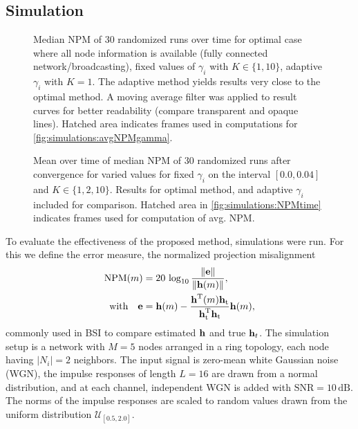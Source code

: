 \documentclass{article}
\begin{document}
\subsection[]{Simulation}
\begin{figure}[t]
    \centering
    
    \caption[]{Median NPM of 30 randomized runs over time for optimal case where all node information is available (fully connected network/broadcasting), fixed values of \(\gamma_i\) with \(K \in \{1,10\}\), adaptive \(\gamma_i\) with \(K=1\). The adaptive method yields results very close to the optimal method. A moving average filter was applied to result curves for better readability (compare transparent and opaque lines). Hatched area indicates frames used in computations for \autoref{fig:simulations:avgNPMgamma}.}
    \label{fig:simulations:NPMtime}
\end{figure}
\begin{figure}[t]
    \centering
    
    \caption[]{Mean over time of median NPM of 30 randomized runs after convergence for varied values for fixed \(\gamma_i\) on the interval \([0.0, 0.04]\) and \(K \in \{1,2,10\}\). Results for optimal method, and adaptive \(\gamma_i\) included for comparison. Hatched area in \autoref{fig:simulations:NPMtime} indicates frames used for computation of avg. NPM.}
    \label{fig:simulations:avgNPMgamma}
\end{figure}
To evaluate the effectiveness of the proposed method, simulations were run.
For this we define the error measure, the normalized projection misalignment
\begin{equation}
    \begin{aligned}
        \text{NPM}(m) &= 20\,\log_{10} \frac{\left\| \bm{\mathrm{e}} \right\|}{\left\|\bm{\mathrm{h}}(m)\right\|},\\
        \text{with}\quad \bm{\mathrm{e}} &= \bm{\mathrm{h}}(m) - \frac{\bm{\mathrm{h}}^{\mathrm{T}} (m) \bm{\mathrm{h}}_{\text{t}}}{\bm{\mathrm{h}}_{\text{t}}^{\mathrm{T}} \bm{\mathrm{h}}_{\text{t}}}\bm{\mathrm{h}}(m),
    \end{aligned}
\end{equation}
commonly used in BSI to compare estimated \(\bm{\mathrm{h}}\) and true \(\bm{\mathrm{h}}_t\).
The simulation setup is a network with \(M=5\) nodes arranged in a ring topology, each node having \(|N_i|=2\) neighbors.
The input signal is zero-mean white Gaussian noise (WGN), the impulse responses of length \(L=16\) are drawn from a normal distribution, and at each channel, independent WGN is added with \(\text{SNR}=10\,\text{dB}\).
The norms of the impulse responses are scaled to random values drawn from the uniform distribution \(\mathcal{U}_{[0.5,2.0]}\).
\end{document}
